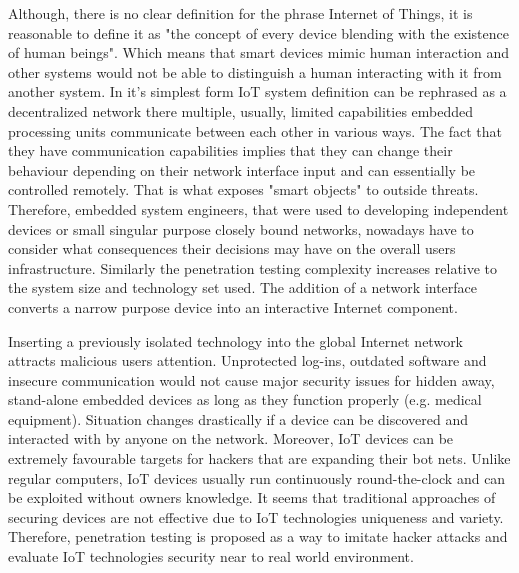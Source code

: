 Although, there is no clear definition for the phrase Internet of Things, it is reasonable to define it as "the concept of every device blending with the existence of human beings"\cite{DBLP:journals/corr/MendezPY17}. Which means that smart devices mimic human interaction and other systems would not be able to distinguish a human interacting with it from another system. In it's simplest form IoT system definition can be rephrased as a decentralized network there multiple, usually, limited capabilities embedded processing units communicate between each other in various ways\cite{itu-t2060}. The fact that they have communication capabilities implies that they can change their behaviour depending on their network interface input and can essentially be controlled remotely. That is what exposes "smart objects" to outside threats\cite{riahi:hal-00868362}. Therefore, embedded system engineers, that were used to developing independent devices or small singular purpose closely bound networks, nowadays have to consider what consequences their decisions may have on the overall users infrastructure. Similarly the penetration testing complexity increases relative to the system size and technology set used. The addition of a network interface converts a narrow purpose device into an interactive Internet component.

Inserting a previously isolated technology into the global Internet network attracts malicious users attention. Unprotected log-ins, outdated software and insecure communication would not cause major security issues for hidden away, stand-alone embedded devices as long as they function properly (e.g. medical equipment). Situation changes drastically if a device can be discovered and interacted with by anyone on the network. Moreover, IoT devices can be extremely favourable targets for hackers that are expanding their bot nets. Unlike regular computers, IoT devices usually run continuously round-the-clock and can be exploited without owners knowledge\cite{191952}. It seems that traditional approaches of securing devices are not effective\cite{DBLP:journals/corr/abs-1803-05022} due to IoT technologies uniqueness and variety. Therefore, penetration testing is proposed as a way to imitate hacker attacks and evaluate IoT technologies security near to real world environment.

